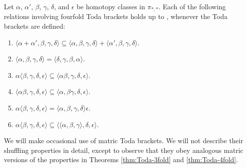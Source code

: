 \begin{thm}
\label{thm:Toda-4fold}
Let $\alpha$, $\alpha'$, $\beta$, $\gamma$, $\delta$, and 
$\epsilon$ be homotopy classes in $\pi_{*,*}$. 
Each of the following relations involving fourfold Toda brackets
holds up to , whenever the Toda brackets are defined:
\begin{enumerate}
\item $ \langle \alpha + \alpha', \beta, \gamma, \delta\rangle \subseteq  \langle \alpha, \beta, \gamma, \delta\rangle + \langle \alpha', \beta, \gamma, \delta\rangle.$
\item $ \langle \alpha, \beta, \gamma, \delta\rangle = \langle \delta, \gamma, \beta, \alpha \rangle.$
\item $\alpha \langle \beta, \gamma, \delta, \epsilon \rangle \subseteq \langle \alpha\beta, \gamma, \delta, \epsilon \rangle.$
\item $\langle \alpha  \beta, \gamma, \delta, \epsilon \rangle \subseteq \langle \alpha, \beta\gamma, \delta, \epsilon \rangle.$
\item $\alpha \langle \beta, \gamma, \delta, \epsilon \rangle = \langle \alpha, \beta, \gamma, \delta \rangle \epsilon.$
\item 
\label{part:a<b,c,d,e>}
$\alpha \langle \beta, \gamma, \delta, \epsilon \rangle \subseteq \langle \langle \alpha, \beta, \gamma \rangle, \delta, \epsilon \rangle.$
\end{enumerate}
\end{thm}


We will make occasional use of matric Toda brackets. 
We will not describe their shuffling properties in detail, except to observe that
they obey analogous matric versions of the properties
in Theorems \ref{thm:Toda-3fold} and \ref{thm:Toda-4fold}. 







